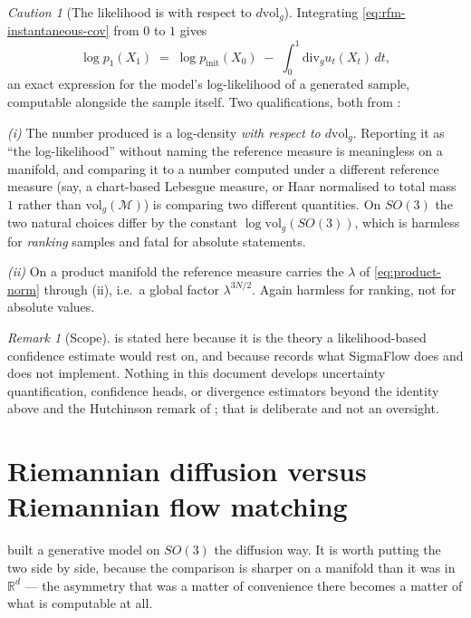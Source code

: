 \documentclass[11pt,a4paper]{report}
\theoremstyle{definition}
\theoremstyle{remark}
\newtheorem{remark}[remark]{Remark}
\newtheorem{caution}[caution]{Caution}
\newcommand{\RR}{\mathbb R}
\begin{document}
\begin{caution}[The likelihood is with respect to $d\mathrm{vol}_g$]
\label{caution:rfm-likelihood-reference}
Integrating \eqref{eq:rfm-instantaneous-cov} from $0$ to $1$ gives
\[
\log p_1(X_1) \;=\; \log p_{\mathrm{init}}(X_0) \;-\; \int_0^1 \mathrm{div}_gu_t(X_t)\,dt ,
\]
an exact expression for the model's log-likelihood of a generated sample,
computable alongside the sample itself. Two qualifications, both from
:

\emph{(i)} The number produced is a log-density \emph{with respect to
$d\mathrm{vol}_g$}. Reporting it as ``the log-likelihood'' without naming
the reference measure is meaningless on a manifold, and comparing it to a
number computed under a different reference measure (say, a chart-based
Lebesgue measure, or Haar normalised to total mass $1$ rather than
$\mathrm{vol}_g(\mathcal M)$) is comparing two different quantities. On
$SO(3)$ the two natural choices differ by the constant
$\log\mathrm{vol}_g(SO(3))$, which is harmless for \emph{ranking} samples
and fatal for absolute statements.

\emph{(ii)} On a product manifold the reference measure carries the
$\lambda$ of \eqref{eq:product-norm} through
(ii), i.e.\ a global factor $\lambda^{3N/2}$. Again
harmless for ranking, not for absolute values.
\end{caution}

\begin{remark}[Scope]
\label{rem:rfm-uq-scope}
 is stated here because it is the theory a
likelihood-based confidence estimate would rest on, and because
 records what SigmaFlow does and does not
implement. Nothing in this document develops uncertainty quantification,
confidence heads, or divergence estimators beyond the identity above and the
Hutchinson remark of ; that is deliberate and not
an oversight.
\end{remark}

\section{Riemannian diffusion versus Riemannian flow matching}
\label{sec:rfm-vs-diffusion}

 built a generative model on $SO(3)$ the diffusion
way. It is worth putting the two side by side, because the comparison is
sharper on a manifold than it was in $\RR^d$ --- the asymmetry that was a
matter of convenience there becomes a matter of what is computable at all.
\end{document}
